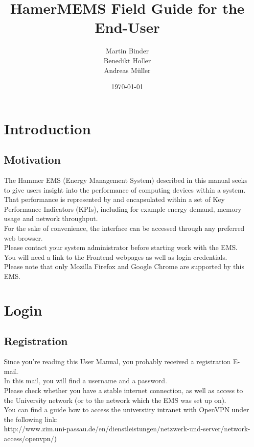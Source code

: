 \documentclass[twoside,a4paper]{refart}
\title{HamerMEMS Field Guide for the End-User}
\author{
    Martin Binder \\
    Benedikt Holler \\
    Andreas M\"uller }
\date{\today}
\begin{document}
    \maketitle

    \tableofcontents

    \newpage



    \section{Introduction}

    \subsection{Motivation}
The Hammer EMS (Energy Management System) described in this manual seeks to give users insight into the performance of computing devices within a system. \\
That performance is represented by and encapsulated within a set of Key Performance Indicators (KPIs), including for example energy demand, memory usage and network throughput. \\
For the sake of convenience, the interface can be accessed through any preferred web browser. \\
Please contact your system administrator before starting work with the EMS. You will need a link to the Frontend webpages as well as login credentials. \\
Please note that only Mozilla Firefox and Google Chrome are supported by this EMS.



    \section{Login}
    \label{login}

    \subsection{Registration}
Since you're reading this User Manual, you probably received a registration E-mail. \\
In this mail, you will find a username and a password. \\
Please check whether you have a stable internet connection, as well as access to the University network (or to the network which the EMS was set up on). \\ 
You can find a guide how to access the universtity intranet with OpenVPN under the following link:\\http://www.zim.uni-passau.de/en/dienstleistungen/netzwerk-und-server/network-access/openvpn/) \\
\end{document}
